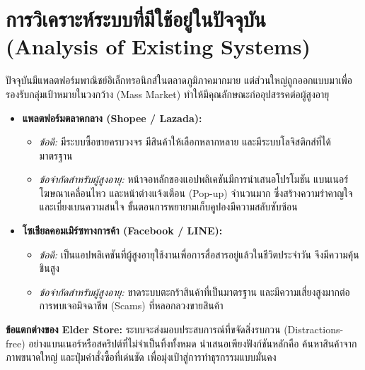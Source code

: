 \section{การวิเคราะห์ระบบที่มีใช้อยู่ในปัจจุบัน (Analysis of Existing Systems)}
ปัจจุบันมีแพลตฟอร์มพาณิชย์อิเล็กทรอนิกส์ในตลาดภูมิภาคมากมาย \cite{ecommerce2019} แต่ส่วนใหญ่ถูกออกแบบมาเพื่อรองรับกลุ่มเป้าหมายในวงกว้าง (Mass Market) ทำให้มีคุณลักษณะก่ออุปสรรคต่อผู้สูงอายุ
\begin{itemize}
    \item \textbf{แพลตฟอร์มตลาดกลาง (Shopee / Lazada):} 
    \begin{itemize}
        \item \textit{ข้อดี:} มีระบบซื้อขายครบวงจร มีสินค้าให้เลือกหลากหลาย และมีระบบโลจิสติกส์ที่ได้มาตรฐาน
        \item \textit{ข้อจำกัดสำหรับผู้สูงอายุ:} หน้าจอหลักของแอปพลิเคชันมีการนำเสนอโปรโมชัน แบนเนอร์โฆษณาเคลื่อนไหว และหน้าต่างแจ้งเตือน (Pop-up) จำนวนมาก ซึ่งสร้างความรำคาญใจและเบี่ยงเบนความสนใจ ขั้นตอนการพยายามเก็บคูปองมีความสลับซับซ้อน
    \end{itemize}
    \item \textbf{โซเชียลคอมเมิร์ซทางการค้า (Facebook / LINE):}
    \begin{itemize}
        \item \textit{ข้อดี:} เป็นแอปพลิเคชันที่ผู้สูงอายุใช้งานเพื่อการสื่อสารอยู่แล้วในชีวิตประจำวัน จึงมีความคุ้นชินสูง
        \item \textit{ข้อจำกัดสำหรับผู้สูงอายุ:} ขาดระบบตะกร้าสินค้าที่เป็นมาตรฐาน และมีความเสี่ยงสูงมากต่อการพบเจอมิจฉาชีพ (Scams) ที่หลอกลวงขายสินค้า
    \end{itemize}
\end{itemize}
\textbf{ข้อแตกต่างของ Elder Store:} ระบบจะส่งมอบประสบการณ์ที่ขจัดสิ่งรบกวน (Distractions-free) \cite{uxdesign2023} อย่างแบนเนอร์หรือสคริปต์ที่ไม่จำเป็นทิ้งทั้งหมด นำเสนอเพียงฟังก์ชันหลักคือ ค้นหาสินค้าจากภาพขนาดใหญ่ และปุ่มคำสั่งซื้อที่เด่นชัด เพื่อมุ่งเป้าสู่การทำธุรกรรมแบบมั่นคง 

